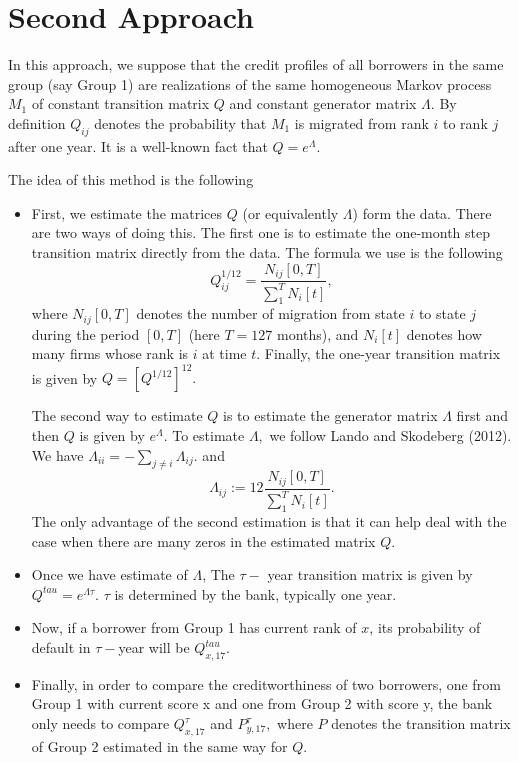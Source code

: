 \documentclass[runningheads,a4paper]{llncs}
\begin{document}
\section{Second Approach}
In this approach, we suppose that the credit profiles of all borrowers in the same group (say Group 1) are realizations of the same homogeneous Markov process $M_1$ of constant transition matrix $Q$ and constant generator matrix $\Lambda.$ By definition $Q_{ij}$ denotes the probability that $M_1$ is migrated from  rank $i$ to rank $j$ after one year. It is a well-known fact that $Q=e^{\Lambda}$. 

The idea of this method is the following
\begin{itemize}
    \item First, we estimate the matrices $Q$ (or equivalently $\Lambda$) form the data. There are two ways of doing this. The first one is to estimate the one-month step  transition matrix  directly from the data. The formula we use is the following
    $$Q^{1/12}_{ij}=\frac{N_{ij}[0, T]}{\sum_1^TN_i[t]},$$
    where $N_{ij}[0, T]$ denotes the number of migration from state $i$ to state $j$ during the period $[0, T]$ (here $T=127$ months), and $N_i[t]$ denotes how many firms whose rank is $i$ at time $t.$ Finally, the one-year transition matrix is given by $Q=[Q^{1/12}]^{12}.$
    
    The second way to estimate $Q$ is to estimate the generator matrix $\Lambda$ first and then $Q$ is given by $e^{\Lambda}.$ To estimate $\Lambda,$ we follow Lando and Skodeberg (2012). We have $\Lambda_{ii}=-\sum_{j\not=i}\Lambda_{ij}.$ and
    $$\Lambda_{ij}:=12\frac{N_{ij}[0, T]}{\sum_1^TN_i[t]}.$$
    The only advantage of the second estimation is that it can help deal with  the case when there are many zeros in the estimated matrix $Q.$
    
    \item Once we have estimate of $\Lambda$, The $\tau-$ year transition matrix is given by $Q^{tau}=e^{\Lambda \tau}.$ $\tau$ is determined by the bank, typically one year.
    \item Now, if a borrower from Group 1 has current rank of $x$, its probability of default in $\tau-$year will be $Q^{tau}_{x,17}.$
    \item Finally, in order to compare the creditworthiness of two borrowers, one from Group 1 with current score x and one  from Group 2 with score y, the bank only needs to compare $Q^{\tau}_{x,17}$ and $P^{\tau}_{y,17},$ where $P$ denotes the transition matrix of Group 2 estimated in the same way for $Q.$
\end{itemize}
\end{document}
